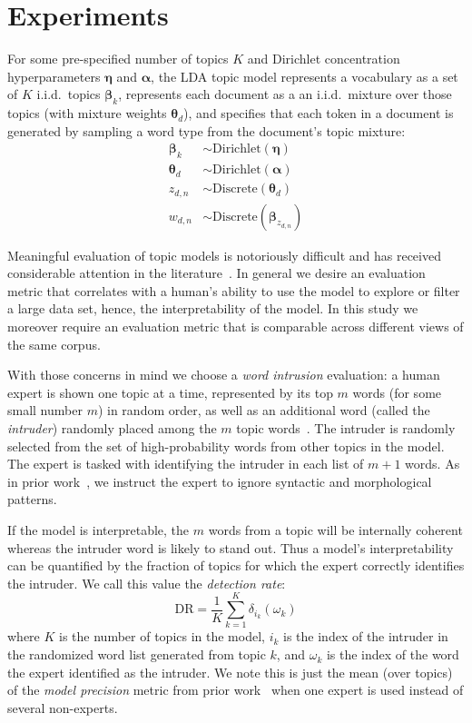 \documentclass[11pt,letterpaper]{article}
\renewcommand{\vec}{\boldsymbol}   %
\newcommand{\valpha}{{\vec{\alpha}}}
\newcommand{\vtheta}{{\vec{\theta}}}
\newcommand{\veta}{{\vec{\eta}}}
\newcommand{\vbeta}{{\vec{\beta}}}
\newcommand{\dirac}[2]{\delta_{#1}\left(#2\right)}
\newcommand{\Discrete}{\ensuremath{\mathrm{Discrete}}}
\newcommand{\Dirichlet}{\ensuremath{\mathrm{Dirichlet}}}
\newcommand{\DR}{\ensuremath{\textrm{DR}}}
\begin{document}
{\section{Experiments}\label{sec:experiments}

For some pre-specified
number of topics $K$ and Dirichlet concentration hyperparameters
$\veta$ and $\valpha$, the LDA topic model represents a vocabulary as a
set of $K$ i.i.d.\ topics $\vbeta_k$, represents each document as a
an i.i.d.\ mixture over those topics (with mixture weights
$\vtheta_d$), and specifies that each token in a document is
generated by sampling a word type from the document's topic mixture:
\begin{align*}
    \vbeta_k  & \sim \Dirichlet\left(\veta\right) \\
    \vtheta_d & \sim \Dirichlet\left(\valpha\right) \\
    z_{d,n}              & \sim \Discrete\left(\vtheta_d\right) \\
    w_{d,n}              & \sim \Discrete\left(\vbeta_{z_{d,n}}\right)
\end{align*}

Meaningful evaluation of topic models is notoriously
difficult and has received considerable attention in the
literature~\cite{chang2009,wallach2009a,newman2010,mimno2011}.
In general we desire an evaluation metric that correlates with a
human's ability to use the model to explore or filter a large data set,
hence, the interpretability of the model.  In this study we moreover
require an evaluation metric that is comparable across different views
of the same corpus.

With those concerns in mind we choose a \emph{word intrusion}
evaluation:
a human expert is shown one topic at a time, represented
by its top $m$ words (for some small number $m$) in random order, as
well as an additional word (called the \emph{intruder}) randomly placed
among the $m$ topic words~\cite{chang2009}.
The intruder is randomly selected from the set of high-probability
words from other topics in the model.
The expert is tasked with identifying the intruder in each list of
$m + 1$ words.
As in prior work~\cite{chang2009}, we instruct the expert to ignore
syntactic and morphological patterns.

If the model is interpretable, the $m$ words from a topic will be
internally coherent whereas the intruder word is likely to stand out.
Thus a model's interpretability can be quantified by the fraction
of topics for which the expert correctly identifies the intruder.  We
call this value the \emph{detection rate}:
\begin{equation*}
    \DR = \frac{1}{K} \sum_{k=1}^K \dirac{i_k}{\omega_k}
\end{equation*}
where $K$ is the number of topics in the model, $i_k$ is the index
of the intruder in the randomized word list generated from topic $k$,
and $\omega_k$ is the index of the word the expert identified as the
intruder.  We note this is just the mean (over topics) of the
\emph{model precision} metric from prior work~\cite{chang2009}
when one expert is used instead of several non-experts.

}
\end{document}

